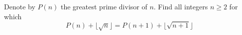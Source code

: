 Denote by $P(n)$ the greatest prime divisor of $n$. Find all integers $n\geq 2$ for which \[P(n)+\lfloor\sqrt{n}\rfloor=P(n+1)+\lfloor\sqrt{n+1}\rfloor\]